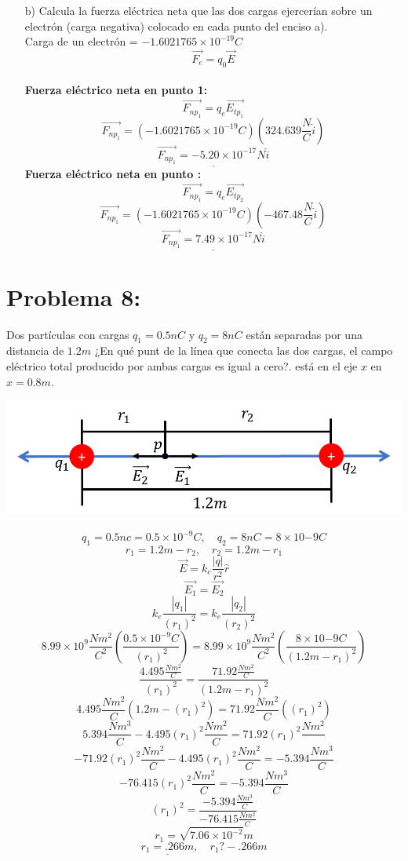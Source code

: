 \documentclass[12pt]{article}
\begin{document}
\begin{enumerate}
					\item[b)]	Calcula la fuerza eléctrica neta que las dos cargas ejercerían sobre
							un electrón (carga negativa) colocado en cada punto del enciso a). \\
							Carga de un electrón = $ -1.6021765 \times 10^{-19}C $
							$$ \vec{F_e} = q_0 \vec{E} $$ \\
							\textbf{Fuerza eléctrico neta en punto 1:}
							$$ \vec{F_{np_1}} = q_e \vec{E_{tp_1}} $$
							$$ \vec{F_{np_1}} = (-1.6021765 \times 10^{-19}C) (324.639 \frac{N}{C} \hat{i}) $$
							$$ \underline{\vec{F_{np_1}} = -5.20 \times 10^{-17}N \hat{i}} $$
							\textbf{Fuerza eléctrico neta en punto :}
							$$ \vec{F_{np_1}} = q_e \vec{E_{tp_2}} $$
							$$ \vec{F_{np_1}} = (-1.6021765 \times 10^{-19}C) (-467.48 \frac{N}{C} \hat{i}) $$
							$$ \underline{\vec{F_{np_1}} = 7.49 \times 10^{-17}N \hat{i}} $$
				\end{enumerate}

		\section{Problema 8:}\label{sec:Problema8}
			Dos partículas con cargas $ q_1 = 0.5nC $ y $ q_2 = 8nC $ están separadas por una distancia
			de $ 1.2m $ ¿En qué punt de la línea que conecta las dos cargas, el campo eléctrico
			total producido por ambas cargas es igual a cero?.
			está en el eje $ x $ en $ x = 0.8m $.
			\begin{center}
				\includegraphics[width=.5\linewidth]{Imp8t1.png} 
			\end{center}
			$$ q_1 = 0.5nc = 0.5 \times 10^{-9}C, \quad q_2 = 8nC = 8 \times 10{-9}C $$
			$$ r_1 = 1.2m - r_2, \quad r_2 = 1.2m - r_1 $$
			$$ \vec{E} = k_e \frac{|q|}{r^2} \hat{r} $$
			$$ \vec{E_1} = \vec{E_2} $$
			$$ k_e \frac{|q_1|}{(r_1)^2} = k_e \frac{|q_2|}{(r_2)^2} $$
			$$ 8.99 \times 10^9 \frac{Nm^2}{C^2} \left( \frac{0.5 \times 10^{-9}C}{(r_1)^2} \right) = 
			8.99 \times 10^9 \frac{Nm^2}{C^2} \left( \frac{8 \times 10{-9}C}{(1.2m - r_1)^2} \right) $$
			$$ \frac{4.495 \frac{Nm^2}{C}}{(r_1)^2} = \frac{71.92 \frac{Nm^2}{C}}{(1.2m - r_1)^2} $$
			$$ 4.495 \frac{Nm^2}{C}(1.2m - (r_1)^2) = 71.92 \frac{Nm^2}{C}((r_1)^2) $$
			$$ 5.394 \frac{Nm^3}{C} - 4.495(r_1)^2 \frac{Nm^2}{C} = 71.92(r_1)^2 \frac{Nm^2}{} $$
			$$ -71.92(r_1)^2 \frac{Nm^2}{C} - 4.495(r_1)^2 \frac{Nm^2}{C} = -5.394 \frac{Nm^3}{C} $$
			$$ -76.415(r_1)^2 \frac{Nm^2}{C}  = -5.394 \frac{Nm^3}{C} $$
			$$ (r_1)^2 = \frac{-5.394 \frac{Nm^3}{C}}{-76.415\frac{Nm^2}{C}} $$
			$$ r_1 = \sqrt{7.06 \times 10^{-2}}m $$
			$$ \underline{r_1 = .266 m}, \quad r_1 ? -.266 m $$ \\
\end{document}
